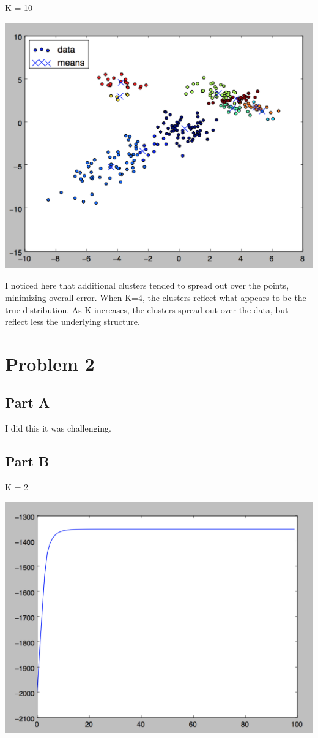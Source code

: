 \documentclass[twoside,11pt]{homework}
\begin{document}
K = 10

\includegraphics[scale=.5]{images/em_10_plot.png}

I noticed here that additional clusters tended to spread out over the points, minimizing overall error. When K=4, the clusters reflect what appears to be the true distribution. As K increases, the clusters spread out over the data, but reflect less the underlying structure.

\section*{Problem 2}

\subsection*{Part A}

I did this it was challenging.

\subsection*{Part B}

K = 2

\includegraphics[scale=.5]{images/vi_2_obj.png}
\end{document}
